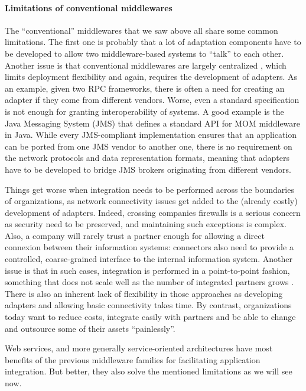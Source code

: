\paragraph{Limitations of conventional middlewares}
The ``conventional'' middlewares that we saw above all share some common limitations. The first one is probably that a lot of adaptation components have to be developed to allow two middleware-based systems to ``talk'' to each other. Another issue is that conventional middlewares are largely centralized \cite{Alonso04}, which limits deployment flexibility and again, requires the development of adapters. As an example, given two RPC frameworks, there is often a need for creating an adapter if they come from different vendors. Worse, even a standard specification is not enough for granting interoperability of systems. A good example is the Java Messaging System (JMS) that defines a standard API for MOM middleware in Java. While every JMS-compliant implementation ensures that an application can be ported from one JMS vendor to another one, there is no requirement on the network protocols and data representation formats, meaning that adapters have to be developed to bridge JMS brokers originating from different vendors.

Things get worse when integration needs to be performed across the boundaries of organizations, as network connectivity issues get added to the (already costly) development of adapters. Indeed, crossing companies firewalls is a serious concern as security need to be preserved, and maintaining such exceptions is complex. Also, a company will rarely trust a partner enough for allowing a direct connexion between their information systems: connectors also need to provide a controlled, coarse-grained interface to the internal information system. Another issue is that in such cases, integration is performed in a point-to-point fashion, something that does not scale well as the number of integrated partners grows \cite{Alonso04}. There is also an inherent lack of flexibility in those approaches as developing adapters and allowing basic connectivity takes time. By contrast, organizations today want to reduce costs, integrate easily with partners and be able to change and outsource some of their assets ``painlessly''.

Web services, and more generally service-oriented architectures have most benefits of the previous middleware families for facilitating application integration. But better, they also solve the mentioned limitations as we will see now.

